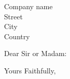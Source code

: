 \documentclass[11pt]{letter}
\begin{document}
\begin{letter}{Company name \\ Street\\ City\\ Country}
\opening{Dear Sir or Madam:}
\lipsum[1-1]
\closing{Yours Faithfully,}

\end{letter}
\end{document}
